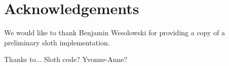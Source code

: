 \section{Acknowledgements}
We would like to thank Benjamin Wesolowski for providing a copy of a preliminary sloth implementation.

Thanks to...
Sloth code?
Yvonne-Anne?
